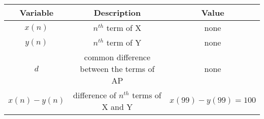 
      \begin{tabular}{|c|c|c|} 
      \hline
\textbf{Variable}& \textbf{Description}& \textbf{Value}\\\hline
         $x(n)$& $n^{th}$ term of X&none\\\hline
          $y(n)$& $n^{th}$ term of Y&none\\\hline
          $d$&common difference between the terms of AP&none\\\hline
          $x(n)-y(n)$& difference of $n^{th}$ terms of X and Y &$x(99)-y(99)=100$ \\ \hline
         
    \end{tabular}

